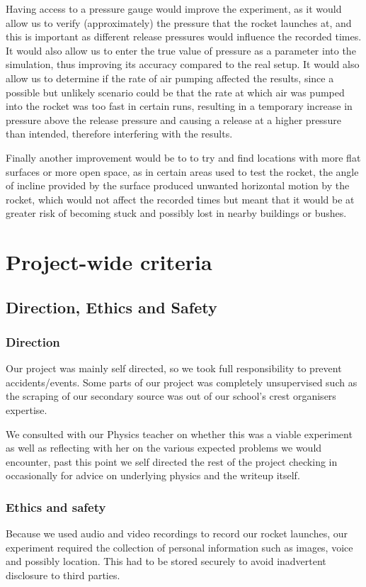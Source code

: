 \documentclass[14pt]{article}
\begin{document}
Having access to a pressure gauge would improve the experiment, as it would allow us to verify (approximately) the pressure that the rocket launches at, and this is important as different release pressures would influence the recorded times. It would also allow us to enter the true value of pressure as a parameter into the simulation, thus improving its accuracy compared to the real setup. It would also allow us to determine if the rate of air pumping affected the results, since a possible but unlikely scenario could be that the rate at which air was pumped into the rocket was too fast in certain runs, resulting in a temporary increase in pressure above the release pressure and causing a release at a higher pressure than intended, therefore interfering with the results.

Finally another improvement would be to to try and find locations with more flat surfaces or more open space, as in certain areas used to test the rocket, the angle of incline provided by the surface produced unwanted horizontal motion by the rocket, which would not affect the recorded times but meant that it would be at greater risk of becoming stuck and possibly lost in nearby buildings or bushes.
\section{Project-wide criteria}
\subsection{Direction, Ethics and Safety}
\subsubsection{Direction}
Our project was mainly self directed, so we took full responsibility to prevent accidents/events.
Some parts of our project was completely unsupervised such as the scraping of our secondary source was out of our school's crest organisers expertise. 

We consulted with our Physics teacher on whether this was a viable experiment as well as reflecting with her on the various expected problems we would encounter, past this point we self directed the rest of the project checking in occasionally for advice on underlying physics and the writeup itself.
\subsubsection{Ethics and safety}
Because we used audio and video recordings to record our rocket launches, our experiment required the collection of personal information such as images, voice and possibly location. This had to be stored securely to avoid inadvertent disclosure to third parties.
\end{document}
